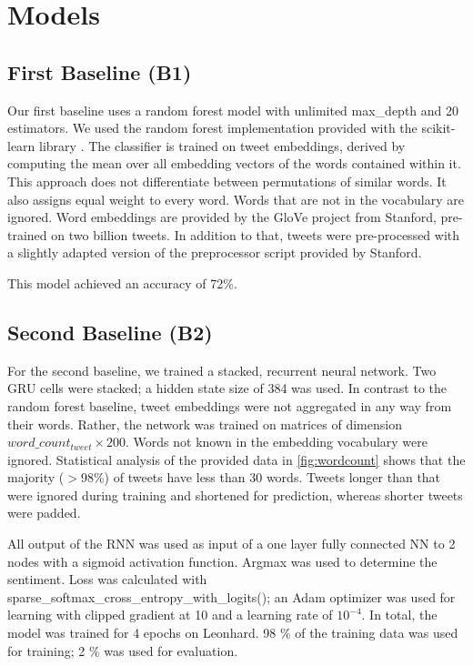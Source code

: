 \documentclass[10pt,conference,compsocconf]{IEEEtran}
\begin{document}
\section{Models}

\subsection{First Baseline (B1)}

Our first baseline uses a random forest model with unlimited
max\_depth and 20 estimators. We used the random forest implementation
provided with the scikit-learn library \cite{scikit-learn}.
The classifier is trained on tweet embeddings,
derived by computing the mean over all embedding
vectors of the words contained within it. This approach does not
differentiate between permutations of similar words. It also assigns
equal weight to every word. Words that are not in the vocabulary are
ignored. Word embeddings are provided by the GloVe \cite{glove}
project from Stanford, pre-trained on two billion tweets. In addition
to that, tweets were pre-processed with a slightly adapted version of
the preprocessor script provided by Stanford.

This model achieved an accuracy of 72\%.


\subsection{Second Baseline (B2)}

For the second baseline, we trained a stacked, recurrent neural
network. Two GRU cells were stacked; a hidden state size of 384 was used.
In contrast to the random forest baseline, tweet embeddings
were not aggregated in any way from their words. Rather, the network
was trained on matrices of dimension \(word\_count_{tweet} \times 200\).
Words not known in the embedding vocabulary were ignored.
Statistical analysis of the provided data in \autoref{fig:wordcount} shows that
the majority ($>$98\%) of tweets have less than 30 words.
Tweets longer than that were ignored during training and shortened for prediction,
whereas shorter tweets were padded.

All output of the RNN was used as input of a one layer fully connected NN to 2 nodes with a sigmoid activation function.
Argmax was used to determine the sentiment. Loss was calculated with sparse\_softmax\_cross\_entropy\_with\_logits(); an Adam optimizer was used for learning with clipped gradient at 10 and a learning rate of $10^{-4}$. In total, the model was trained for 4 epochs on Leonhard.
98 \% of the training data was used for training; 2 \% was used for evaluation.
\end{document}
